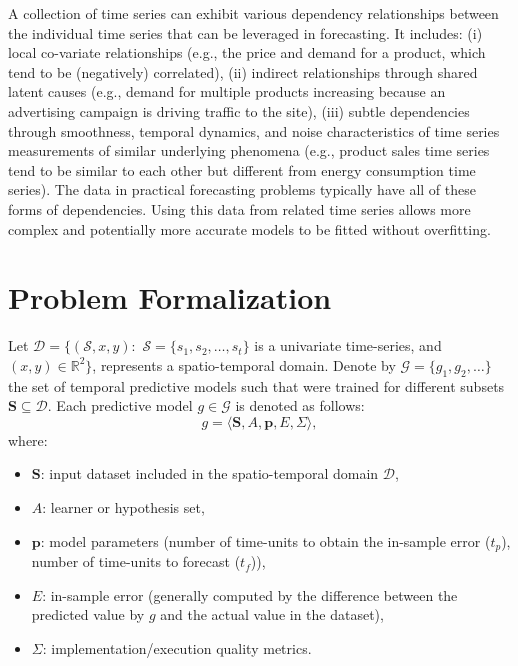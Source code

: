 A collection of time series can exhibit various dependency relationships between the individual time series that can be leveraged in forecasting. It includes:
(i) local co-variate relationships (e.g., the price and demand for a product, which tend to be (negatively) correlated),
(ii) indirect relationships through shared latent causes (e.g., demand for multiple products increasing because an advertising campaign is driving traffic to the site),
(iii) subtle dependencies through smoothness, temporal dynamics, and noise characteristics of time series measurements of similar underlying phenomena (e.g., product sales time series tend to be similar to each other but different from energy consumption time series).
The data in practical forecasting problems typically have all of these forms of dependencies. Using this data from related time series allows more complex and potentially more accurate models to be fitted without overfitting.

\section{Problem Formalization}
\label{Sec:ProblemFormalization}

Let $\mathcal{D} = \{(\mathcal{S}, x, y): \,\, \mathcal{S} = \{s_{1}, s_{2}, \ldots, s_{t}\}$ is a univariate time-series, and $(x,y) \in \mathbb{R}^{2}\}$, represents a spatio-temporal domain. Denote by $\mathcal{G} = \{g_{1}, g_{2}, \ldots \}$ the set of temporal predictive models such that were trained for different subsets $\mathbf{S} \subseteq \mathcal{D}$. Each predictive model $g\in \mathcal{G}$ is denoted as follows:
\begin{equation}
\label{eq:ModelDefinition}
g = \langle \mathbf{S}, A, \mathbf{p}, E, \varSigma \rangle,
\end{equation}
where:
\begin{itemize}[noitemsep,nolistsep]	
	\item $\mathbf{S}$: input dataset included in the spatio-temporal domain $\mathcal{D}$,
	\item $A$: learner or hypothesis set,
	\item $\mathbf{p}$: model parameters (number of time-units to obtain the in-sample error ($t_{p}$), number of time-units to forecast ($t_{f}$)),
	\item $E$: in-sample error (generally computed by the difference between the predicted value by $g$ and the actual value in the dataset),
	\item $\varSigma$: implementation/execution quality metrics.
\end{itemize}

